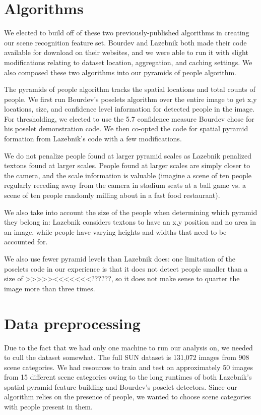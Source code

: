 \documentclass[11pt]{article}
\begin{document}
\section{Algorithms}

We elected to build off of these two previously-published algorithms in creating our scene recognition feature set.  Bourdev and Lazebnik both made their code available for download on their websites, and we were able to run it with slight modifications relating to dataset location, aggregation, and caching settings.  We also composed these two algorithms into our pyramids of people algorithm.

The pyramids of people algorithm tracks the spatial locations and total counts of people.  We first run Bourdev's poselets algorithm over the entire image to get x,y locations, size, and confidence level information for detected people in the image.  For thresholding, we elected to use the 5.7 confidence measure Bourdev chose for his poselet demonstration code.  We then co-opted the code for spatial pyramid formation from Lazebnik's code with a few modifications.

We do not penalize people found at larger pyramid scales as Lazebnik penalized textons found at larger scales.  People found at larger scales are simply closer to the camera, and the scale information is valuable (imagine a scene of ten people regularly receding away from the camera in stadium seats at a ball game vs. a scene of ten people randomly milling about in a fast food restaurant).

We also take into account the size of the people when determining which pyramid they belong in: Lazebnik considers textons to have an x,y position and no area in an image, while people have varying heights and widths that need to be accounted for.

We also use fewer pyramid levels than Lazebnik does: one limitation of the poselets code in our experience is that it does not detect people smaller than a size of >>>>><<<<<<<??????, so it does not make sense to quarter the image more than three times.

\section{Data preprocessing}

Due to the fact that we had only one machine to run our analysis on, we needed to cull the dataset somewhat.  The full SUN dataset is 131,072 images from 908 scene categories.  We had resources to train and test on approximately 50 images from 15 different scene categories owing to the long runtimes of both Lazebnik's spatial pyramid feature building and Bourdev's poselet detectors.  Since our algorithm relies on the presence of people, we wanted to choose scene categories with people present in them.
\end{document}
